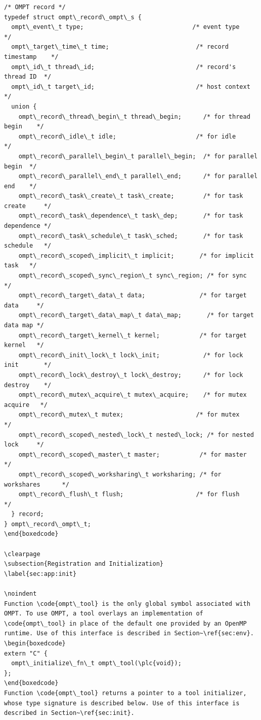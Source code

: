 \documentclass{article}
\begin{document}
\begin{boxedcode}
\begin{verbatim}
/* OMPT record */
typedef struct ompt\_record\_ompt\_s {
  ompt\_event\_t type;                              /* event type          */
  ompt\_target\_time\_t time;                        /* record timestamp    */
  ompt\_id\_t thread\_id;                            /* record's thread ID  */
  ompt\_id\_t target\_id;                            /* host context        */
  union {
    ompt\_record\_thread\_begin\_t thread\_begin;      /* for thread begin    */
    ompt\_record\_idle\_t idle;                      /* for idle            */
    ompt\_record\_parallel\_begin\_t parallel\_begin;  /* for parallel begin  */
    ompt\_record\_parallel\_end\_t parallel\_end;      /* for parallel end    */
    ompt\_record\_task\_create\_t task\_create;        /* for task create     */
    ompt\_record\_task\_dependence\_t task\_dep;       /* for task dependence */
    ompt\_record\_task\_schedule\_t task\_sched;       /* for task schedule   */
    ompt\_record\_scoped\_implicit\_t implicit;       /* for implicit task   */
    ompt\_record\_scoped\_sync\_region\_t sync\_region; /* for sync            */
    ompt\_record\_target\_data\_t data;               /* for target data     */
    ompt\_record\_target\_data\_map\_t data\_map;       /* for target data map */
    ompt\_record\_target\_kernel\_t kernel;           /* for target kernel   */
    ompt\_record\_init\_lock\_t lock\_init;            /* for lock init       */
    ompt\_record\_lock\_destroy\_t lock\_destroy;      /* for lock destroy    */
    ompt\_record\_mutex\_acquire\_t mutex\_acquire;    /* for mutex acquire   */
    ompt\_record\_mutex\_t mutex;                    /* for mutex           */
    ompt\_record\_scoped\_nested\_lock\_t nested\_lock; /* for nested lock     */
    ompt\_record\_scoped\_master\_t master;           /* for master          */
    ompt\_record\_scoped\_worksharing\_t worksharing; /* for workshares      */
    ompt\_record\_flush\_t flush;                    /* for flush           */
  } record;
} ompt\_record\_ompt\_t;
\end{boxedcode}

\clearpage
\subsection{Registration and Initialization} 
\label{sec:app:init}

\noindent
Function \code{ompt\_tool} is the only global symbol associated with OMPT. To use OMPT, a tool overlays an implementation of \code{ompt\_tool} in place of the default one provided by an OpenMP runtime. Use of this interface is described in Section~\ref{sec:env}.
\begin{boxedcode}
extern "C" {
  ompt\_initialize\_fn\_t ompt\_tool(\plc{void});
};
\end{boxedcode}
Function \code{ompt\_tool} returns a pointer to a tool initializer, whose type signature is described below. Use of this interface is described in Section~\ref{sec:init}.


\end{verbatim}
\end{boxedcode}
\end{document}
